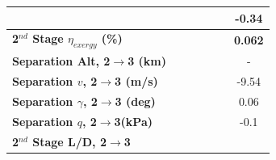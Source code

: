\begin{table}[ht]
\begin{tabular}{l c c c c c c}
	& \firstsecondSeparationgammamSPARTANNinetyFiveNoReturn
	& \firstsecondSeparationgammamSPARTANNinetySevenFiveNoReturn
	& \firstsecondSeparationgammamSPARTANStandardNoReturn
	& \firstsecondSeparationgammamSPARTANOneHundredTwoFiveNoReturn
	& \firstsecondSeparationgammamSPARTANOneHundredFiveNoReturn
	&-0.34
	\\
	\hline 
	\textbf{2$^{nd}$ Stage $\eta_{exergy}$ (\%)}
	& \textbf{\secondExergyEffmSPARTANNinetyFiveNoReturn}
	& \textbf{\secondExergyEffmSPARTANNinetySevenFiveNoReturn}
	& \textbf{\secondExergyEffmSPARTANStandardNoReturn}
	& \textbf{\secondExergyEffmSPARTANOneHundredTwoFiveNoReturn}
	& \textbf{\secondExergyEffmSPARTANOneHundredFiveNoReturn}
	& \textbf{0.062}
	\\
	\textbf{Separation Alt, 2$\rightarrow$3 (km)}
	& \secondthirdSeparationAltmSPARTANNinetyFiveNoReturn
	& \secondthirdSeparationAltmSPARTANNinetySevenFiveNoReturn
	& \secondthirdSeparationAltmSPARTANStandardNoReturn
	& \secondthirdSeparationAltmSPARTANOneHundredTwoFiveNoReturn
	& \secondthirdSeparationAltmSPARTANOneHundredFiveNoReturn
	& -
	\\
	\textbf{Separation $v$, 2$\rightarrow$3 (m/s)}
	& \secondthirdSeparationvmSPARTANNinetyFiveNoReturn
	& \secondthirdSeparationvmSPARTANNinetySevenFiveNoReturn
	& \secondthirdSeparationvmSPARTANStandardNoReturn
	& \secondthirdSeparationvmSPARTANOneHundredTwoFiveNoReturn
	& \secondthirdSeparationvmSPARTANOneHundredFiveNoReturn
	&-9.54
	\\
	\textbf{Separation $\gamma$, 2$\rightarrow$3 (deg)}
	& \secondthirdSeparationgammamSPARTANNinetyFiveNoReturn
	& \secondthirdSeparationgammamSPARTANNinetySevenFiveNoReturn
	& \secondthirdSeparationgammamSPARTANStandardNoReturn
	& \secondthirdSeparationgammamSPARTANOneHundredTwoFiveNoReturn
	& \secondthirdSeparationgammamSPARTANOneHundredFiveNoReturn
	&0.06
	\\
	\textbf{Separation $q$, 2$\rightarrow$3(kPa)}
	& \secondthirdSeparationqmSPARTANNinetyFiveNoReturn
	& \secondthirdSeparationqmSPARTANNinetySevenFiveNoReturn
	& \secondthirdSeparationqmSPARTANStandardNoReturn
	& \secondthirdSeparationqmSPARTANOneHundredTwoFiveNoReturn
	& \secondthirdSeparationqmSPARTANOneHundredFiveNoReturn
	&-0.1
	\\
	\textbf{2$^{nd}$ Stage L/D, 2$\rightarrow$3}
	& \secondthirdSeparationLDmSPARTANNinetyFiveNoReturn
	& \secondthirdSeparationLDmSPARTANNinetySevenFiveNoReturn
	& \secondthirdSeparationLDmSPARTANStandardNoReturn
	& \secondthirdSeparationLDmSPARTANOneHundredTwoFiveNoReturn
	& \secondthirdSeparationLDmSPARTANOneHundredFiveNoReturn

\end{tabular}
\end{table}
